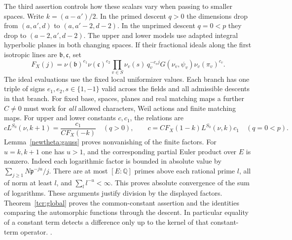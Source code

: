 The third assertion controls how these scalars vary when passing to
smaller spaces. Write \(k=(a-a')/2\). In the primed descent \(q>0\)
the dimensions drop from \((a,a',d)\) to \((a,a'-2,d-2)\).
In the unprimed descent \(q=0<p\) they drop to \((a-2,a',d-2)\).
The upper and lower models use adapted integral hyperbolic planes
in both changing spaces. If their fractional ideals along the first
isotropic lines are \(\mathfrak b,\mathfrak c\), set
\[
 F_X(j)=\nu(\mathfrak b)^{e_1}\nu(\mathfrak c)^{e_2}
    \prod_{v\in S}\nu_v(s)\,
       q_v^{-c_v j}G(\nu_v,\psi_v)\nu_v(\pi_v)^{c_v}.
\]
The ideal evaluations use the fixed local uniformizer values. Each
branch has one triple of signs \(e_1,e_2,s\in\{1,-1\}\) valid across
the fields and all admissible descents in that branch. For fixed
base, spaces, planes and real matching maps a further \(C\ne0\) must
work for \emph{all} allowed characters, Weil actions and finite
matching maps. For upper and lower constants \(c,c_1\), the relations are
\[
 cL^{S_0}(\nu,k+1)=\frac{c_1}{CF_X(-k)}
       \quad(q>0),\qquad
 c=CF_X(1-k)L^{S_0}(\nu,k)c_1\quad(q=0<p).
\]
Lemma~\ref{newtheta:gauss} proves nonvanishing of the finite factors.
For \(u=k,k+1\) one has \(u>1\), and the corresponding partial
Euler product over \(E\) is nonzero. Indeed each logarithmic factor
is bounded in absolute value by
\(\sum_{j\ge1}N\mathfrak p^{-ju}/j\).
There are at most \([E:\mathbb Q]\) primes above each rational
prime \(l\), all of norm at least \(l\), and
\(\sum_l l^{-u}<\infty\). This proves absolute convergence of the
sum of logarithms. These arguments justify division by the displayed
factors. Theorem~\ref{tcr:global} proves the common-constant assertion and the
identities comparing the automorphic functions through the descent.
In particular equality of a constant term detects a difference only up
to the kernel of that constant-term operator.
.

